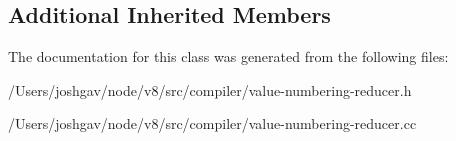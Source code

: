 \subsection*{Additional Inherited Members}


The documentation for this class was generated from the following files\+:\begin{DoxyCompactItemize}
\item 
/\+Users/joshgav/node/v8/src/compiler/value-\/numbering-\/reducer.\+h\item 
/\+Users/joshgav/node/v8/src/compiler/value-\/numbering-\/reducer.\+cc\end{DoxyCompactItemize}

